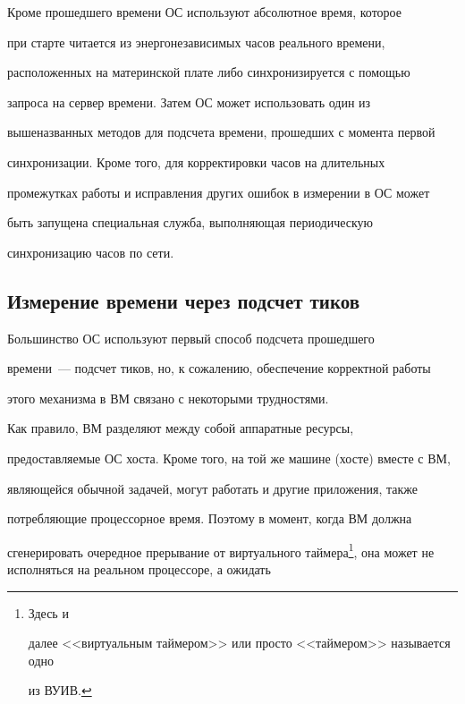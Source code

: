      Кроме прошедшего времени ОС используют абсолютное время, которое 


при старте читается из энергонезависимых часов реального времени, 


расположенных на материнской плате либо синхронизируется с помощью 


запроса на сервер времени. Затем ОС может использовать один из 


вышеназванных методов для подсчета времени, прошедших с момента первой 


синхронизации. Кроме того, для корректировки часов на длительных 


промежутках работы и исправления других ошибок в измерении в ОС может 


быть запущена специальная служба, выполняющая периодическую 


синхронизацию часов по сети.





\subsection{Измерение времени через подсчет тиков} 




     


     Большинство ОС используют первый способ подсчета прошедшего 


времени~--- подсчет тиков, но, к сожалению, обеспечение корректной работы 


этого механизма в ВМ связано с некоторыми трудностями.


     


     Как правило, ВМ разделяют между собой аппаратные ресурсы, 


предоставляемые ОС хоста. Кроме того, на той же машине (хосте) вместе с ВМ, 


являющейся обычной задачей, могут работать и другие приложения, также 


потребляющие процессорное время. Поэтому в момент, когда ВМ должна 


сгенерировать очередное прерывание от виртуального таймера\footnote{Здесь и 


далее <<виртуальным таймером>> или просто <<таймером>> называется одно 


из ВУИВ.}, она может не исполняться на реальном процессоре, а ожидать 


